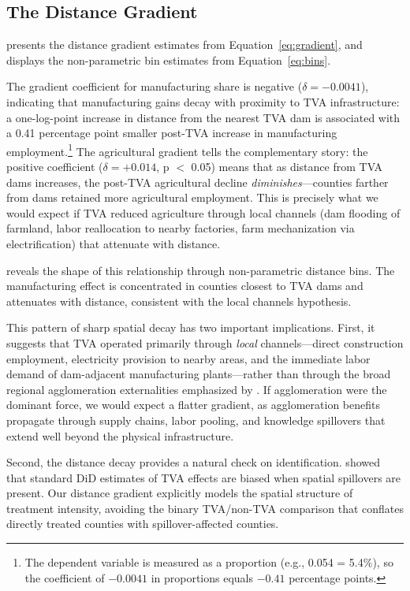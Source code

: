 \documentclass[12pt]{article}
\begin{document}

\subsection{The Distance Gradient}

 presents the distance gradient estimates from Equation~\eqref{eq:gradient}, and  displays the non-parametric bin estimates from Equation~\eqref{eq:bins}.

The gradient coefficient for manufacturing share is negative ($\delta = -0.0041$), indicating that manufacturing gains decay with proximity to TVA infrastructure: a one-log-point increase in distance from the nearest TVA dam is associated with a 0.41 percentage point smaller post-TVA increase in manufacturing employment.\footnote{The dependent variable is measured as a proportion (e.g., 0.054 = 5.4\%), so the coefficient of $-0.0041$ in proportions equals $-0.41$ percentage points.} The agricultural gradient tells the complementary story: the positive coefficient ($\delta = +0.014$, p $<$ 0.05) means that as distance from TVA dams increases, the post-TVA agricultural decline \textit{diminishes}---counties farther from dams retained more agricultural employment. This is precisely what we would expect if TVA reduced agriculture through local channels (dam flooding of farmland, labor reallocation to nearby factories, farm mechanization via electrification) that attenuate with distance.

 reveals the shape of this relationship through non-parametric distance bins. The manufacturing effect is concentrated in counties closest to TVA dams and attenuates with distance, consistent with the local channels hypothesis.

This pattern of sharp spatial decay has two important implications. First, it suggests that TVA operated primarily through \textit{local} channels---direct construction employment, electricity provision to nearby areas, and the immediate labor demand of dam-adjacent manufacturing plants---rather than through the broad regional agglomeration externalities emphasized by \citet{kline2014}. If agglomeration were the dominant force, we would expect a flatter gradient, as agglomeration benefits propagate through supply chains, labor pooling, and knowledge spillovers that extend well beyond the physical infrastructure.

Second, the distance decay provides a natural check on identification. \citet{butts2024} showed that standard DiD estimates of TVA effects are biased when spatial spillovers are present. Our distance gradient explicitly models the spatial structure of treatment intensity, avoiding the binary TVA/non-TVA comparison that conflates directly treated counties with spillover-affected counties.
\end{document}
